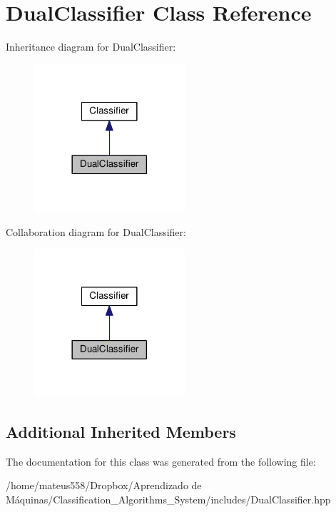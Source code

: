 \hypertarget{class_dual_classifier}{}\section{Dual\+Classifier Class Reference}
\label{class_dual_classifier}


Inheritance diagram for Dual\+Classifier\+:\nopagebreak
\begin{figure}[H]
\begin{center}
\leavevmode
\includegraphics[width=158pt]{class_dual_classifier__inherit__graph}
\end{center}
\end{figure}


Collaboration diagram for Dual\+Classifier\+:\nopagebreak
\begin{figure}[H]
\begin{center}
\leavevmode
\includegraphics[width=158pt]{class_dual_classifier__coll__graph}
\end{center}
\end{figure}
\subsection*{Additional Inherited Members}


The documentation for this class was generated from the following file\+:\begin{DoxyCompactItemize}
\item 
/home/mateus558/\+Dropbox/\+Aprendizado de Máquinas/\+Classification\+\_\+\+Algorithms\+\_\+\+System/includes/Dual\+Classifier.\+hpp\end{DoxyCompactItemize}
